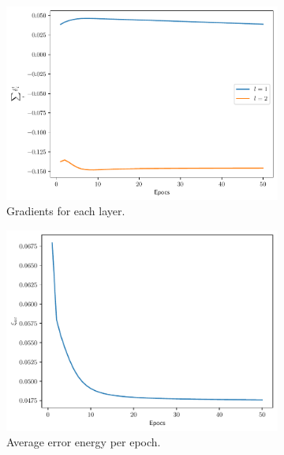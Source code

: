 \documentclass[conference]{IEEEtran}
\theoremstyle{definition}
\theoremstyle{remark}
\theoremstyle{remark}
\begin{document}
\begin{figure}
    \centering
    \begin{subfigure}[b]{0.32\textwidth}
        \centering
        \includegraphics[width=\textwidth]{figs/3-0.5-emb-gradients.pdf}
        \caption{Gradients for each layer.}
    \end{subfigure}
    \begin{subfigure}[b]{0.32\textwidth}
        \centering
        \includegraphics[width=\textwidth]{figs/3-0.5-emb-error.pdf}
        \caption{Average error energy per epoch.}
    \end{subfigure}
    \begin{subfigure}[b]{0.32\textwidth}
        \centering

\end{subfigure}
\end{figure}
\end{document}
